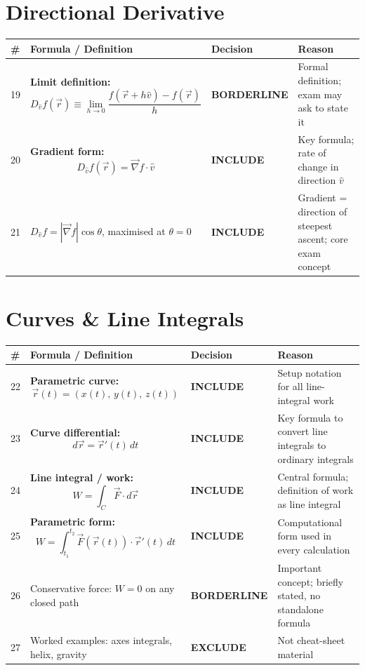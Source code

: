 \documentclass[11pt,a4paper]{article}
\newcommand{\inc}{\textbf{\textcolor{incgreen}{INCLUDE}}}
\newcommand{\exc}{\textbf{\textcolor{exred}{EXCLUDE}}}
\newcommand{\bord}{\textbf{\textcolor{borderorange}{BORDERLINE}}}
\begin{document}
\section{Directional Derivative}

\begin{longtable}{p{0.5cm} p{7.5cm} p{2.2cm} p{3.5cm}}
\toprule
\# & Formula / Definition & Decision & Reason \\
\midrule
\endhead

19 & \textbf{Limit definition:}
\[
  D_{\hat{v}}f(\vec{r}) \equiv \lim_{h\to 0} \frac{f(\vec{r}+h\hat{v})-f(\vec{r})}{h}
\]
& \bord & Formal definition; exam may ask to state it \\[14pt]

20 & \textbf{Gradient form:}
\[
  D_{\hat{v}}f(\vec{r}) = \vec{\nabla}f\cdot\hat{v}
\]
& \inc & Key formula; rate of change in direction $\hat{v}$ \\[14pt]

21 & $D_{\hat{v}}f = |\vec{\nabla}f|\cos\theta$, maximised at $\theta=0$ & \inc & Gradient = direction of steepest ascent; core exam concept \\[6pt]

\bottomrule
\end{longtable}

\section{Curves \& Line Integrals}

\begin{longtable}{p{0.5cm} p{7.5cm} p{2.2cm} p{3.5cm}}
\toprule
\# & Formula / Definition & Decision & Reason \\
\midrule
\endhead

22 & \textbf{Parametric curve:}
\[
  \vec{r}(t) = (x(t),\,y(t),\,z(t))
\]
& \inc & Setup notation for all line-integral work \\[14pt]

23 & \textbf{Curve differential:}
\[
  d\vec{r} = \vec{r}'(t)\,dt
\]
& \inc & Key formula to convert line integrals to ordinary integrals \\[14pt]

24 & \textbf{Line integral / work:}
\[
  W = \int_C \vec{F}\cdot d\vec{r}
\]
& \inc & Central formula; definition of work as line integral \\[14pt]

25 & \textbf{Parametric form:}
\[
  W = \int_{t_1}^{t_2} \vec{F}(\vec{r}(t))\cdot\vec{r}'(t)\,dt
\]
& \inc & Computational form used in every calculation \\[14pt]

26 & Conservative force: $W=0$ on any closed path & \bord & Important concept; briefly stated, no standalone formula \\[6pt]

27 & Worked examples: axes integrals, helix, gravity & \exc & Not cheat-sheet material \\[6pt]

\bottomrule
\end{longtable}
\end{document}
